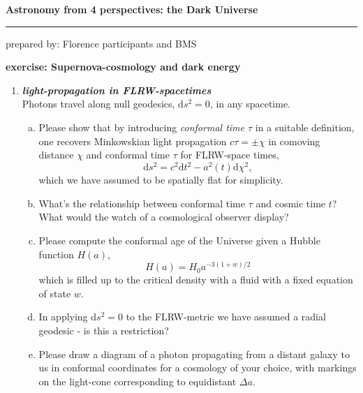 \documentclass[a4paper,12pt]{article}
\newcommand{\question}[1]{\textbf{\textit{#1}}}
\newcommand{\HRule}{\rule{\linewidth}{0.3mm}}
\newcommand{\dd}{\mathrm{d}}
\begin{document}
\pagestyle{empty}

\begin{center}
\LARGE \textbf{Astronomy from 4 perspectives: the Dark Universe}
\HRule
\end{center}
\begin{flushright}
prepared by: Florence participants and BMS
\end{flushright}
\begin{center}
{\Large \textbf{exercise: Supernova-cosmology and dark energy}}
\end{center}
\vspace{5mm}

\begin{enumerate}

\item \question{light-propagation in FLRW-spacetimes}\\
Photons travel along null geodesics, $\dd s^2=0$, in any spacetime. 
\begin{enumerate}[(a)]
\item{Please show that by introducing {\em conformal time $\tau$} in a suitable definition, one recovers Minkowskian light propagation $c\tau = \pm\chi$ in comoving distance $\chi$ and conformal time $\tau$ for FLRW-space times,
\begin{equation}
\dd s^2 = c^2\dd t^2 - a^2(t)\dd\chi^2,
\end{equation}
which we have assumed to be spatially flat for simplicity.}
\item{What's the relationship between conformal time $\tau$ and cosmic time $t$? What would the watch of a cosmological observer display?}
\item{Please compute the conformal age of the Universe given a Hubble function $H(a)$,
\begin{equation}
H(a) = H_0 a^{-3(1+w)/2}
\end{equation}
which is filled up to the critical density with a fluid with a fixed equation of state $w$.
}
\item{In applying $\dd s^2=0$ to the FLRW-metric we have assumed a radial geodesic - is this a restriction?}
\item{Please draw a diagram of a photon propagating from a distant galaxy to us in conformal coordinates for a cosmology of your choice, with markings on the light-cone corresponding to equidistant $\Delta a$.}
\end{enumerate}



\end{enumerate}
\end{document}
